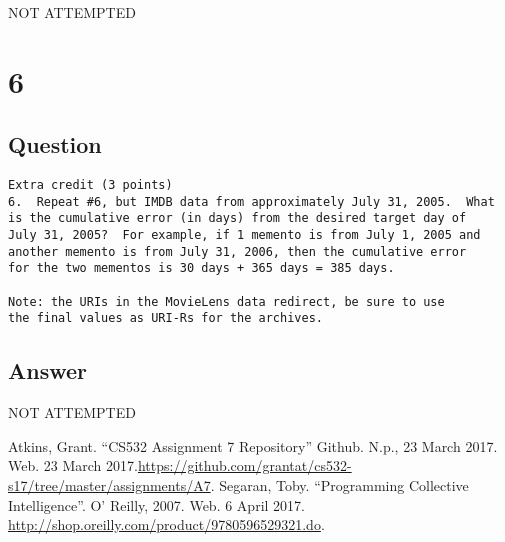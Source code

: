 \documentclass[letterpaper,11pt]{article}
\begin{document}
\begin{center}
\Huge{NOT ATTEMPTED}
\end{center}


\clearpage


\section*{6}

\subsection*{Question}

\begin{verbatim}
Extra credit (3 points)
6.  Repeat #6, but IMDB data from approximately July 31, 2005.  What
is the cumulative error (in days) from the desired target day of
July 31, 2005?  For example, if 1 memento is from July 1, 2005 and 
another memento is from July 31, 2006, then the cumulative error 
for the two mementos is 30 days + 365 days = 385 days.

Note: the URIs in the MovieLens data redirect, be sure to use
the final values as URI-Rs for the archives.
\end{verbatim}

\subsection*{Answer}

\begin{center}
\Huge{NOT ATTEMPTED}
\end{center}

\clearpage



\begin{thebibliography}{9}
Atkins, Grant. ``CS532 Assignment 7 Repository'' Github. N.p., 23 March 2017. Web. 23 March 2017.\url{https://github.com/grantat/cs532-s17/tree/master/assignments/A7}.
Segaran, Toby. ``Programming Collective Intelligence''. O' Reilly, 2007. Web. 6 April 2017. \url{http://shop.oreilly.com/product/9780596529321.do}.
\end{thebibliography}
\end{document}
